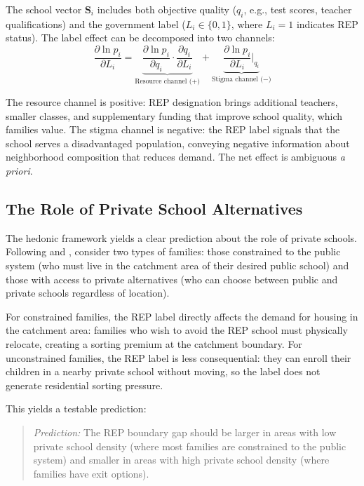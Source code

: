 \documentclass[12pt]{article}
\begin{document}
The school vector $\mathbf{S}_i$ includes both objective quality ($q_i$, e.g., test scores, teacher qualifications) and the government label ($L_i \in \{0, 1\}$, where $L_i = 1$ indicates REP status). The label effect can be decomposed into two channels:
\begin{equation}\label{eq:decompose}
\frac{\partial \ln p_i}{\partial L_i} = \underbrace{\frac{\partial \ln p_i}{\partial q_i} \cdot \frac{\partial q_i}{\partial L_i}}_{\text{Resource channel (+)}} + \underbrace{\frac{\partial \ln p_i}{\partial L_i}\bigg|_{q_i}}_{\text{Stigma channel ($-$)}}
\end{equation}

The resource channel is positive: REP designation brings additional teachers, smaller classes, and supplementary funding that improve school quality, which families value. The stigma channel is negative: the REP label signals that the school serves a disadvantaged population, conveying negative information about neighborhood composition that reduces demand. The net effect is ambiguous \textit{a priori}.

\subsection{The Role of Private School Alternatives}

The hedonic framework yields a clear prediction about the role of private schools. Following \citet{nechyba2006} and \citet{fack2010}, consider two types of families: those constrained to the public system (who must live in the catchment area of their desired public school) and those with access to private alternatives (who can choose between public and private schools regardless of location).

For constrained families, the REP label directly affects the demand for housing in the catchment area: families who wish to avoid the REP school must physically relocate, creating a sorting premium at the catchment boundary. For unconstrained families, the REP label is less consequential: they can enroll their children in a nearby private school without moving, so the label does not generate residential sorting pressure.

This yields a testable prediction:
\begin{quote}
\textit{Prediction:} The REP boundary gap should be larger in areas with low private school density (where most families are constrained to the public system) and smaller in areas with high private school density (where families have exit options).
\end{quote}
\end{document}
